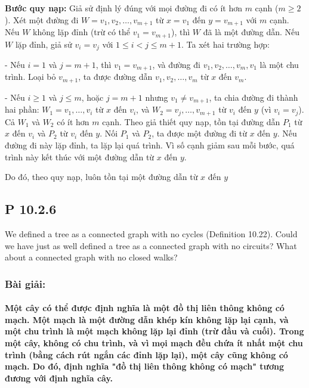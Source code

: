 \documentclass[a4paper,12pt]{article}
\begin{document}
\textbf{Bước quy nạp:} Giả sử định lý đúng với mọi đường đi có ít hơn \( m \) cạnh (\( m \geq 2 \)). Xét một đường đi \( W = v_1, v_2, \ldots, v_{m+1} \) từ \( x = v_1 \) đến \( y = v_{m+1} \) với \( m \) cạnh. Nếu \( W \) không lặp đỉnh (trừ có thể \( v_1 = v_{m+1} \)), thì \( W \) đã là một đường dẫn. Nếu \( W \) lặp đỉnh, giả sử \( v_i = v_j \) với \( 1 \leq i < j \leq m+1 \). Ta xét hai trường hợp:

- Nếu \( i = 1 \) và \( j = m+1 \), thì \( v_1 = v_{m+1} \), và đường đi \( v_1, v_2, \ldots, v_m, v_1 \) là một chu trình. Loại bỏ \( v_{m+1} \), ta được đường dẫn \( v_1, v_2, \ldots, v_m \) từ \( x \) đến \( v_m \).

- Nếu \( i \geq 1 \) và \( j \leq m \), hoặc \( j = m+1 \) nhưng \( v_1 \neq v_{m+1} \), ta chia đường đi thành hai phần: \( W_1 = v_1, \ldots, v_i \) từ \( x \) đến \( v_i \), và \( W_2 = v_j, \ldots, v_{m+1} \) từ \( v_i \) đến \( y \) (vì \( v_i = v_j \)). Cả \( W_1 \) và \( W_2 \) có ít hơn \( m \) cạnh. Theo giả thiết quy nạp, tồn tại đường dẫn \( P_1 \) từ \( x \) đến \( v_i \) và \( P_2 \) từ \( v_i \) đến \( y \). Nối \( P_1 \) và \( P_2 \), ta được một đường đi từ \( x \) đến \( y \). Nếu đường đi này lặp đỉnh, ta lặp lại quá trình. Vì số cạnh giảm sau mỗi bước, quá trình này kết thúc với một đường dẫn từ \( x \) đến \( y \).

Do đó, theo quy nạp, luôn tồn tại một đường dẫn từ \( x \) đến \( y \)

\subsection*{P 10.2.6}
We defined a tree as a connected graph with no cycles (Definition 10.22). Could we have just as well defined a tree as a connected graph with no circuits? What about a connected graph with no closed walks?

\subsubsection*{Bài giải:}
\paragraph{Một cây có thể được định nghĩa là một đồ thị liên thông không có mạch. Một mạch là một đường dẫn khép kín không lặp lại cạnh, và một chu trình là một mạch không lặp lại đỉnh (trừ đầu và cuối). Trong một cây, không có chu trình, và vì mọi mạch đều chứa ít nhất một chu trình (bằng cách rút ngắn các đỉnh lặp lại), một cây cũng không có mạch. Do đó, định nghĩa "đồ thị liên thông không có mạch" tương đương với định nghĩa cây.}
\end{document}
